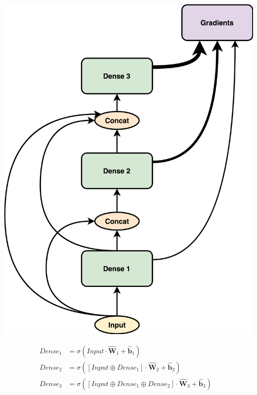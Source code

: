 \usepackage{}\documentclass{article}
\let\oldhat\hat
\renewcommand{\hat}[1]{\oldhat{\mathbf{#1}}}
\begin{document}
\noindent\begin{minipage}{.45\textwidth}
   \centering
   \includegraphics[scale=0.09]{GSC.png}
   \label{fig:GSC.png}
\end{minipage}
\begin{minipage}{.45\textwidth}
\begin{equation}
\label{eq:gsc_math_representation}
\begin{aligned}
       Dense_{1} &= \sigma(Input \cdot \hat{W}_{1} + \hat{b}_{1}) &\\
       Dense_{2} &= \sigma([Input \oplus Dense_{1}] \cdot \hat{W}_{2} + \hat{b}_{2}) &\\
       Dense_{3} &= \sigma([Input \oplus Dense_{1} \oplus Dense_{2}] \cdot \hat{W}_{3} + \hat{b}_{3}) 
\end{aligned}
\end{equation}
\end{minipage}
\end{document}
